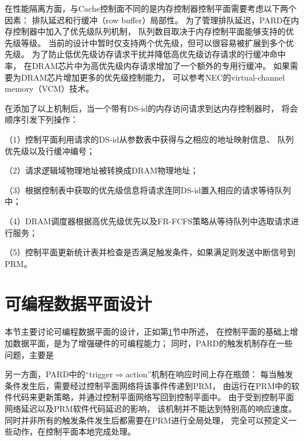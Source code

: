 
在性能隔离方面，与Cache控制面不同的是内存控制器控制平面需要考虑以下两个因素：
排队延迟和行缓冲（row buffer）局部性。
为了管理排队延迟，PARD在内存控制器中加入了优先级队列机制，
队列数目取决于内存控制平面能够支持的优先级等级。
当前的设计中暂时仅支持两个优先级，但可以很容易被扩展到多个优先级。
为了防止低优先级访存请求干扰并降低高优先级访存请求的行缓冲命中率，
在DRAM芯片中为高优先级内存请求增加了一个额外的专用行缓冲。
如果需要为DRAM芯片增加更多的优先级控制能力，
可以参考NEC的virtual-channel memory（VCM）技术。

在添加了以上机制后，当一个带有DS-id的内存访问请求到达内存控制器时，
将会顺序引发下列操作：

（1）控制平面利用请求的DS-id从参数表中获得与之相应的地址映射信息、
队列优先级以及行缓冲编号；

（2）请求逻辑域物理地址被转换成DRAM物理地址；

（3）根据控制表中获取的优先级信息将请求连同DS-id置入相应的请求等待队列中；

（4）DRAM调度器根据高优先级优先以及FR-FCFS\cite{rixner_memory_2000}策略从等待队列中选取请求进行服务；

（5）控制平面更新统计表并检查是否满足触发条件，如果满足则发送中断信号到PRM。


\section{可编程数据平面设计}

本节主要讨论可编程数据平面的设计，正如第\ref{}节中所述，
在控制平面的基础上增加数据平面，是为了增强硬件的可编程能力；
同时，PARD的触发机制存在一些问题，主要是

另一方面，PARD中的``trigger$\Rightarrow$action''机制在响应时间上存在瓶颈：
每当触发条件发生后，需要经过控制平面网络将该事件传递到PRM，
由运行在PRM中的软件代码来更新策略，并通过控制平面网络写回到控制平面中。
由于受到控制平面网络延迟以及PRM软件代码延迟的影响，
该机制并不能达到特别高的响应速度。
同时并非所有的触发条件发生后都需要在PRM进行全局处理，
完全可以预定义一些动作，在控制平面本地完成处理。

